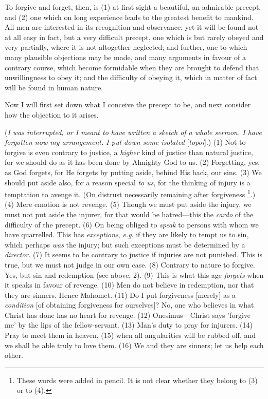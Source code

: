 To forgive and forget, then, is (1) at first
sight a beautiful, an admirable precept, and (2) one which on long
experience leads to the greatest benefit to mankind. All men are
interested in its recognition and observance; yet it will be found not
at all easy in fact, but a very difficult precept, one which is but
rarely obeyed and very partially, where it is not altogether
neglected; and further, one to which many plausible objections may be
made, and many arguments in favour of a contrary course, which become
formidable when they are brought to defend that unwillingness to obey
it; and the difficulty of obeying it, which in matter of fact
will be found in human nature.

Now I will first set down what I conceive the
precept to be, and next consider how the objection to it arises.

(\emph{I was interrupted, or I meant to have written
a sketch of a whole sermon. I have forgotten now my arrangement. I put
down some isolated} [\emph{topoi}].) (1) Not to forgive is even
contrary to justice, a \emph{higher} kind of justice than natural
justice, for we should do as it has been done by Almighty God to us.
(2) Forgetting, yes, as God forgets, for He forgets by putting aside,
behind His back, our sins. (3) We should put aside also, for a reason
special \emph{to us}, for the thinking of injury is a temptation to
avenge it. (On distrust necessarily remaining after forgiveness \footnote{These words were added in
pencil. It is not clear whether they belong to (3) or to (4).}.) (4) Mere emotion is not revenge. (5) Though we must put aside
the injury, we must not put aside the injurer, for that would be
hatred—this the \emph{cardo} of the difficulty of the precept. (6)
On being obliged to \emph{speak} to persons with whom we have
quarrelled. This has \emph{exceptions}, \emph{e.g}. if they are likely
to tempt us to sin, which perhaps \emph{was} the injury; but such
exceptions must be determined by a \emph{director}. (7) It seems to be
contrary to justice if injuries are not punished. This is true, but we
must not judge in our own case. (8) Contrary to nature to forgive.
Yes, but sin and redemption (see above, 2). (9) This is what this age \emph{forgets}
when it speaks in favour of revenge. (10) Men do not believe in
redemption, nor that they are sinners. Hence Mahomet. (11) Do I
put forgiveness [merely] as a \emph{condition} [of obtaining
forgiveness for ourselves]? No, one who believes in what Christ has
done has no heart for revenge. (12) Onesimus—Christ says 'forgive
me' by the lips of the fellow-servant. (13) Man's duty to pray for
injurers. (14) Pray to meet them in heaven, (15) when all angularities
will be rubbed off, and we shall be able truly to love them. (16) We
and they are sinners; let us help each other.


